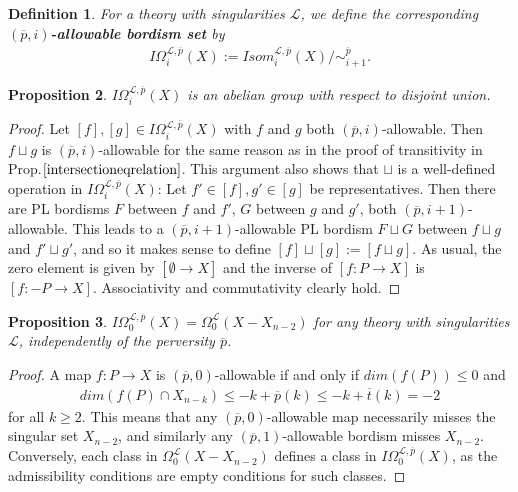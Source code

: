 \documentclass{scrreprt}
\newtheorem{prop}{Proposition}[chapter]
\newtheorem{definition}[prop]{Definition}
\begin{document}
\begin{definition}
For a theory with singularities $\mathcal{L}$, we define the corresponding $(\overline{p},i)$\textbf{-allowable bordism set} by 
\begin{align*}
I \Omega_i^{\mathcal{L}, \overline{p}}(X) := Isom_i^{\mathcal{L}, \overline{p}}(X)/ \sim_{i+1}^{\overline{p}} .
\end{align*}
\end{definition}

\begin{prop}
$I \Omega_i^{\mathcal{L}, \overline{p}}(X) $ is an abelian group with respect to disjoint union.
\end{prop}

\begin{proof}
Let $[f],[g] \in I \Omega_i^{\mathcal{L}, \overline{p}}(X) $ with $f$ and $g$ both $(\overline{p},i)$-allowable. Then $f \sqcup g$ is $(\overline{p},i)$-allowable for the same reason as in the proof of transitivity in Prop.$\ref{intersectioneqrelation}$. This argument also shows that $\sqcup$ is a well-defined operation in $I \Omega_i^{\mathcal{L}, \overline{p}}(X)$: Let $f' \in [f],g' \in [g]$ be representatives. Then there are PL bordisms $F$ between $f$ and $f'$, $G$ between $g$ and $g'$, both $(\overline{p},i+1)$-allowable. This leads to a $(\overline{p},i+1)$-allowable PL bordism $F \sqcup G$ between $f \sqcup g$ and $f' \sqcup g'$, and so it makes sense to define $[f] \sqcup [g]:=[f \sqcup g]$. As usual, the zero element is given by $[\emptyset \to X]$ and the inverse of $[f: P \to X]$ is $[f: -P \to X]$. Associativity and commutativity clearly hold.
\end{proof}

\begin{prop}\label{Iomegazero}
$I \Omega_0^{\mathcal{L}, \overline{p}}(X)= \Omega_0^{\mathcal{L}}(X-X_{n-2})$ for any theory with singularities $\mathcal{L}$, independently of the perversity $\overline{p}$.
\end{prop}

\begin{proof}
A map $f:P \to X$ is $(\overline{p},0)$-allowable if and only if $dim(f(P)) \leq 0$ and
\begin{align*}
 dim(f(P) \cap X_{n-k}) \leq -k+\overline{p}(k) \leq -k+ \overline{t}(k) =-2
\end{align*} for all $k \geq 2$. This means that any $(\overline{p},0)$-allowable map necessarily misses the singular set $X_{n-2}$, and similarly any $(\overline{p},1)$-allowable bordism misses $X_{n-2}$. Conversely, each class in $ \Omega_0^{\mathcal{L}}(X-X_{n-2})$ defines a class in $I \Omega_0^{\mathcal{L}, \overline{p}}(X)$, as the admissibility conditions are empty conditions for such classes.
\end{proof}
\end{document}
